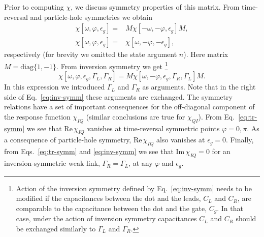 \documentclass[aps,reprint,longbibliography, prb]{revtex4-2}
\begin{document}
Prior to computing $\chi$, we discuss symmetry properties of this matrix. From time-reversal and particle-hole symmetries we obtain
\begin{align}
    \chi[\omega,\varphi,\epsilon_g]=&M\chi[-\omega,-\varphi,\epsilon_g]M\label{eq:tr-symm},\\
     \chi[\omega,\varphi,\epsilon_g]=& \chi[\omega,-\varphi,-\epsilon_g]\label{eq:ph-symm},
\end{align}
respectively (for brevity we omitted the state argument $n$). Here matrix $M = \mathrm{diag}\{1,-1\}$. From inversion symmetry we get \footnote{Action of the inversion symmetry defined by Eq.~\eqref{eq:inv-symm} needs to be modified if the capacitances between the dot and the leads, $C_L$ and $C_R$, are comparable to the capacitance between the dot and the gate, $C_g$. In that case, under the action of inversion symmetry capacitances $C_L$ and $C_R$ should be exchanged similarly to $\Gamma_L$ and $\Gamma_R$.}
\begin{equation}
    \label{eq:inv-symm}
    \chi[\omega,\varphi,\epsilon_g,\Gamma_L,\Gamma_R]=M\chi[\omega,-\varphi,\epsilon_g,\Gamma_R,\Gamma_L]M.
\end{equation}
In this expression we introduced $\Gamma_L$ and $\Gamma_R$ as arguments. Note that in the right side of Eq.~\eqref{eq:inv-symm} these arguments are exchanged. The symmetry relations have a set of important consequences for the off-diagonal component of the response function $\chi_{IQ}$ (similar conclusions are true for $\chi_{QI}$). From Eq.~\eqref{eq:tr-symm} we see that $\mathrm{Re}\,\chi_{IQ}$ vanishes at time-reversal symmetric points $\varphi = 0,\pi$. As a consequence of particle-hole symmetry, $\mathrm{Re}\,\chi_{IQ}$ also vanishes at $\epsilon_g=0$. Finally, from Eqs.~\eqref{eq:tr-symm} and \eqref{eq:inv-symm} we see that $\mathrm{Im}\,\chi_{IQ}=0$ for an inversion-symmetric weak link, $\Gamma_R = \Gamma_L$, at any $\varphi$ and $\epsilon_g$.
\end{document}
